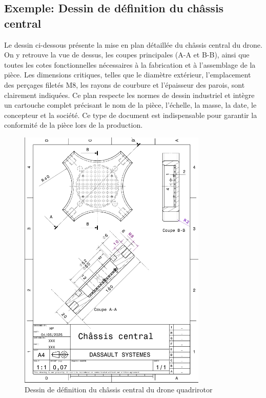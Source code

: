 \documentclass[a4paper,12pt]{report}
\begin{document}
\subsection{Exemple: Dessin de définition du châssis central}

Le dessin ci-dessous présente la mise en plan détaillée du châssis central du drone. On y retrouve la vue de dessus, les coupes principales (A-A et B-B), ainsi que toutes les cotes fonctionnelles nécessaires à la fabrication et à l'assemblage de la pièce. Les dimensions critiques, telles que le diamètre extérieur, l'emplacement des perçages filetés M8, les rayons de courbure et l'épaisseur des parois, sont clairement indiquées. Ce plan respecte les normes de dessin industriel et intègre un cartouche complet précisant le nom de la pièce, l'échelle, la masse, la date, le concepteur et la société. Ce type de document est indispensable pour garantir la conformité de la pièce lors de la production.

\begin{figure}[H]
    \centering
    \includegraphics[width=0.8\textwidth]{images/chassis_central_plan.png}
    \caption{Dessin de définition du châssis central du drone quadrirotor}
    \label{fig:chassis_central_plan}
\end{figure}
\end{document}
